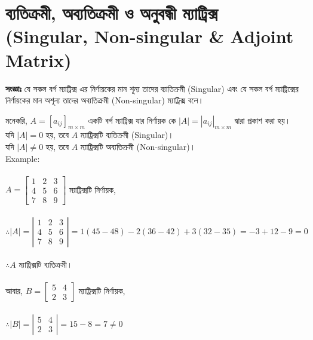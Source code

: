 \section{ব্যতিক্রমী, অব্যতিক্রমী ও অনুবন্ধী ম্যাট্রিক্স \\(Singular, Non-singular \& Adjoint Matrix)}
\begin{tcolorbox}[colback=green!5!white,colframe=green!75!black,title=\textbf{ব্যতিক্রমী ও অব্যতিক্রমী ম্যাট্রিক্স (Singular \& Non-singular Matrix)}]
	 \textbf{সংজ্ঞাঃ} যে সকল বর্গ ম্যাট্রিক্স এর নির্ণায়কের মান শূন্য তাদের ব্যাতিক্রমী (Singular) এবং যে সকল বর্গ ম্যাট্রিক্সের নির্ণায়কের মান অশূন্য তাদের অব্যতিক্রমী (Non-singular) ম্যাট্রিক্স বলে।
\end{tcolorbox}
মনেকরি, $A=[a_{ij}]_{m \times m}$ একটি বর্গ ম্যাট্রিক্স যার নির্ণায়ক কে $|A|=|a_{ij}|_{m \times m}$ দ্বারা প্রকাশ করা হয়।\\
যদি $|A|=0$ হয়, তবে $A$ ম্যাট্রিক্সটি ব্যতিক্রমী (Singular)। \\
যদি $|A|\neq 0$ হয়, তবে $A$ ম্যাট্রিক্সটি অব্যতিক্রমী (Non-singular)।\\
Example: \\ \\
$A=\left[\begin{array}{ccc}
1 & 2 & 3 \\
4 & 5 & 6 \\
7 & 8 & 9
\end{array}\right]$ ম্যাট্রিক্সটি নির্ণায়ক,\\ \\
$\therefore |A|=\left|\begin{array}{ccc}
1 & 2 & 3 \\
4 & 5 & 6 \\
7 & 8 & 9
\end{array}\right|=1(45-48)-2(36-42)+3(32-35)=-3+12-9=0$\\ \\
$\therefore A$ ম্যাট্রিক্সটি ব্যতিক্রমী। \\ \\
আবার, $B=\left[\begin{array}{cc}
5 & 4\\
2 & 3
\end{array}\right]$ ম্যাট্রিক্সটি নির্ণায়ক,\\ \\
$\therefore |B|=\left|\begin{array}{cc}
5 & 4 \\
2 & 3
\end{array}\right|=15-8=7\neq 0$\\ \\

